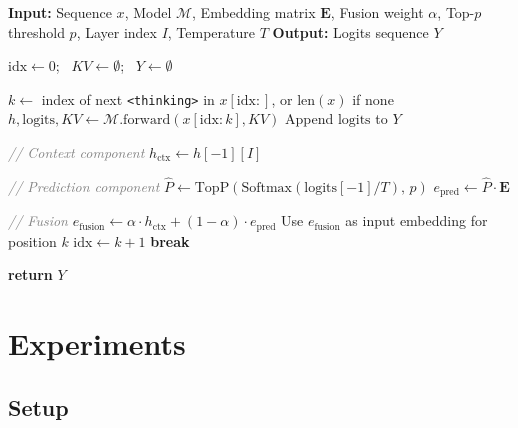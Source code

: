 \documentclass{article}
\theoremstyle{plain}
\theoremstyle{definition}
\theoremstyle{remark}
\begin{document}
\begin{algorithm}[tb]
   \caption{LT-Tuning Forward Pass}
   \label{alg:ltf}
\begin{algorithmic}
 \STATE \textbf{Input:} Sequence $x$, Model $\mathcal{M}$, Embedding matrix $\mathbf{E}$, Fusion weight $\alpha$, Top-$p$ threshold $p$, Layer index $I$, Temperature $T$
   \STATE \textbf{Output:} Logits sequence $Y$
   
   
   \vspace{0.5em}
   \STATE $\text{idx} \leftarrow 0$; \, $KV \leftarrow \emptyset$; \, $Y \leftarrow \emptyset$
   
   \vspace{0.3em}
      \STATE $k \leftarrow$ index of next \texttt{<thinking>} in $x[\text{idx}:]$, or $\text{len}(x)$ if none
      \STATE $h, \text{logits}, KV \leftarrow \mathcal{M}.\text{forward}(x[\text{idx}:k], KV)$
      \STATE Append $\text{logits}$ to $Y$
      
      \vspace{0.3em}
         \STATE \textcolor{gray}{\textit{// Context component}}
         \STATE $h_{\text{ctx}} \leftarrow h[-1][I]$
         
         \STATE \textcolor{gray}{\textit{// Prediction component}}
         \STATE $\hat{P} \leftarrow \text{TopP}(\text{Softmax}(\text{logits}[-1] / T), \, p)$
         \STATE $e_{\text{pred}} \leftarrow \hat{P} \cdot \mathbf{E}$
         
         \STATE \textcolor{gray}{\textit{// Fusion}}
         \STATE $e_{\text{fusion}} \leftarrow \alpha \cdot h_{\text{ctx}} + (1-\alpha) \cdot e_{\text{pred}}$
         \STATE Use $e_{\text{fusion}}$ as input embedding for position $k$
         \STATE $\text{idx} \leftarrow k + 1$
      \ELSE
         \STATE \textbf{break}
      \ENDIF
   \ENDWHILE
   
   \vspace{0.3em}
   \STATE \textbf{return} $Y$
\end{algorithmic}
\end{algorithm}


\section{Experiments}
\subsection{Setup}
\end{document}
